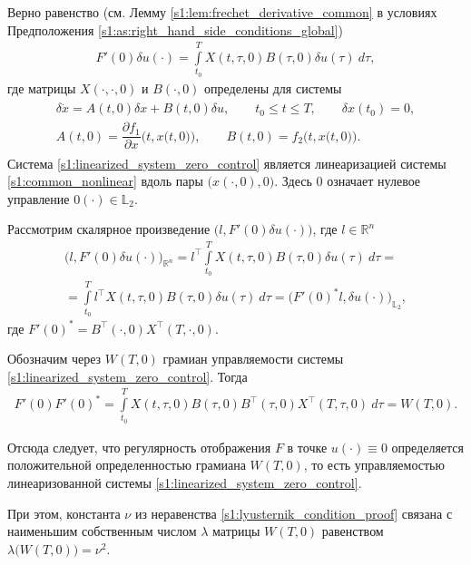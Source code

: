 \documentclass[../main.tex]{subfiles}
\begin{document}
Верно равенство (см. Лемму \ref{s1:lem:frechet_derivative_common} в условиях Предположения \ref{s1:as:right_hand_side_conditions_global})
\begin{gather*}
 F'(0) \delta u(\cdot) = \int\limits_{t_0}^{T} X(t, \tau, 0) B(\tau, 0) \delta u(\tau) \ d\tau,
\end{gather*}
где матрицы $X(\cdot, \cdot, 0)$ и $B(\cdot, 0)$ определены для системы
 \begin{gather}\label{s1:linearized_system_zero_control}
 \begin{gathered}
 		\delta \dot{x} = A(t, 0) \delta x + B(t, 0) \delta u, \qquad t_0 \leqslant t \leqslant T, \qquad \delta x(t_0) = 0, \\
 		A(t, 0) = \dfrac{\partial f_1}{\partial x} \Big(t,x\big(t,0\big)\Big), \qquad
 		B(t, 0) = f_2 \Big(t,x\big(t,0\big)\Big).
 \end{gathered}
\end{gather}
 Система \eqref{s1:linearized_system_zero_control} является линеаризацией системы \eqref{s1:common_nonlinear} вдоль пары $\Big(x(\cdot, 0), 0\Big) $.
Здесь $0$ означает нулевое управление $0(\cdot) \in \mathbb{L}_2$.

Рассмотрим скалярное произведение $ \Big(l, F'(0) \delta u(\cdot)\Big) $, где $ l \in \mathbb{R}^n$
\begin{gather*}
	\Big(l, F'(0) \delta u(\cdot)\Big)_{\mathbb{R}^n} =
	 l^{\top} \int\limits_{t_0}^{T} X(t, \tau, 0) B(\tau, 0) \delta u(\tau) \ d\tau = \\ = 
	 \int\limits_{t_0}^{T} l^{\top} X(t, \tau, 0) B(\tau, 0) \delta u(\tau) \ d\tau =
	 \Big(F'(0)^* l, \delta u(\cdot)\Big)_{\mathbb{L}_2},
\end{gather*}
где $ F'(0)^* = B^{\top} (\cdot, 0) X^{\top}(T, \cdot, 0)$.

Обозначим через $W(T,0) $ грамиан управляемости системы \eqref{s1:linearized_system_zero_control}.
Тогда 
\begin{gather}\label{s1:self_adjoint_with_derivative}
 F'(0) F'(0)^* = \int\limits_{t_0}^{T} X(t, \tau, 0) B(\tau, 0) B^{\top} (\tau, 0) X^{\top}(T, \tau, 0) \ d\tau= W(T,0).
\end{gather}

Отсюда следует, что регулярность отображения $F$ в точке $u(\cdot) \equiv 0$ определяется положительной определенностью грамиана $W(T,0) $, то есть управляемостью линеаризованной системы \eqref{s1:linearized_system_zero_control}. 

При этом, константа $\nu$ из неравенства \eqref{s1:lyusternik_condition_proof} связана с наименьшим собственным числом $\lambda$ матрицы $W(T,0) $ равенством $\lambda\big(W(T,0)\big) = \nu^2$.
 
\end{document}
